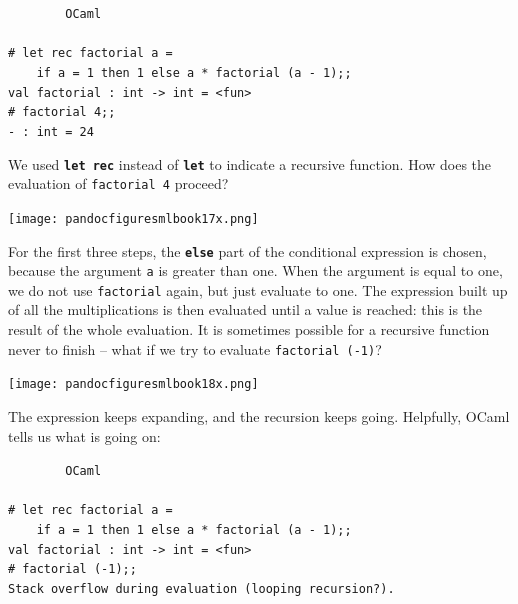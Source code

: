 \documentclass[]{book}
\newcommand{\smspace}{\vspace{4mm}}
\begin{document}
\smspace
\noindent\verb!        OCaml!\\
\noindent\\
\noindent\verb!# let rec factorial a =!\\
\noindent\verb!    if a = 1 then 1 else a * factorial (a - 1);;!\\
\noindent\verb!val factorial : int -> int = <fun>!\\
\noindent\texttt{\# factorial 4;;}\\
\noindent\verb!- : int = 24!
\smspace

\noindent We used \textbf{\texttt{let rec}} instead of \textbf{\texttt{let}} to indicate a recursive function.  How does the evaluation of \texttt{factorial 4} proceed?

\medskip
\begin{center}
\noindent\texttt{[image: pandocfiguresmlbook17x.png]}
\end{center}
\medskip

\noindent For the first three steps, the \textbf{\texttt{else}} part of the conditional expression is chosen, because the argument \texttt{a} is greater than one. When the argument is equal to one, we do not use \texttt{factorial} again, but just evaluate to one. The expression built up of all the multiplications is then evaluated until a value is reached: this is the result of the whole evaluation. It is sometimes possible for a recursive function never to finish -- what if we try to evaluate \texttt{factorial (-1)}?

\medskip
\begin{center}
\noindent\texttt{[image: pandocfiguresmlbook18x.png]}
\end{center}
\medskip

\noindent The expression keeps expanding, and the recursion keeps going. Helpfully, OCaml tells us what is going on:

\smspace
\noindent\verb!        OCaml!\\
\noindent\\
\noindent\verb!# let rec factorial a =!\\
\noindent\verb!    if a = 1 then 1 else a * factorial (a - 1);;!\\
\noindent\verb!val factorial : int -> int = <fun>!\\
\noindent\texttt{\# factorial (-1);;}\\
\noindent\verb!Stack overflow during evaluation (looping recursion?).!
\smspace
\end{document}
